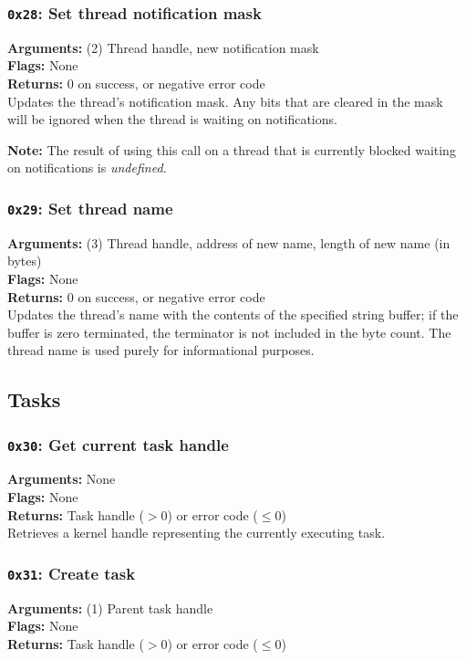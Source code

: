 \documentclass[11pt]{article}
\begin{document}
\subsubsection{{\tt 0x28}: Set thread notification mask}
\textbf{Arguments:} (2) Thread handle, new notification mask \\
\textbf{Flags:} None \\
\textbf{Returns:} 0 on success, or negative error code \\

Updates the thread's notification mask. Any bits that are cleared in the mask will be ignored when the thread is waiting on notifications.

\textbf{Note:} The result of using this call on a thread that is currently blocked waiting on notifications is \textit{undefined.}

\subsubsection{{\tt 0x29}: Set thread name}
\textbf{Arguments:} (3) Thread handle, address of new name, length of new name (in bytes) \\
\textbf{Flags:} None \\
\textbf{Returns:} 0 on success, or negative error code \\

Updates the thread's name with the contents of the specified string buffer; if the buffer is zero terminated, the terminator is not included in the byte count. The thread name is used purely for informational purposes. 


\newpage
\subsection{Tasks}
\subsubsection{{\tt 0x30}: Get current task handle}
\textbf{Arguments:} None \\
\textbf{Flags:} None \\
\textbf{Returns:} Task handle ($>0$) or error code ($\leq0$) \\

Retrieves a kernel handle representing the currently executing task.

\subsubsection{{\tt 0x31}: Create task}
\textbf{Arguments:} (1) Parent task handle \\
\textbf{Flags:} None \\
\textbf{Returns:} Task handle ($>0$) or error code ($\leq0$) \\
\end{document}
